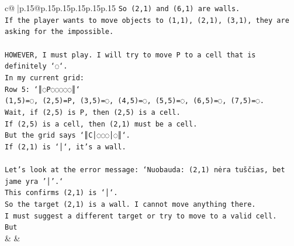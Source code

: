 \documentclass{article}
\begin{document}
{\begin{supertabular}{c@{$\;$}|p{.15\linewidth}@{}p{.15\linewidth}p{.15\linewidth}p{.15\linewidth}p{.15\linewidth}p{.15\linewidth}}
{{{\texttt{So (2,1) and (6,1) are walls.} \\
\texttt{If the player wants to move objects to (1,1), (2,1), (3,1), they are asking for the impossible.} \\
\\ 
\texttt{HOWEVER, I must play. I will try to move P to a cell that is definitely `◌`.} \\
\texttt{In my current grid:} \\
\texttt{Row 5: `║◌P◌◌◌◌◌║`} \\
\texttt{(1,5)=◌, (2,5)=P, (3,5)=◌, (4,5)=◌, (5,5)=◌, (6,5)=◌, (7,5)=◌.} \\
\texttt{Wait, if (2,5) is P, then (2,5) is a cell.} \\
\texttt{If (2,5) is a cell, then (2,1) must be a cell.} \\
\texttt{But the grid says `║C│◌◌◌│◌║`.} \\
\texttt{If (2,1) is `│`, it's a wall.} \\
\\ 
\texttt{Let's look at the error message: `Nuobauda: (2,1) nėra tuščias, bet jame yra '│'.`} \\
\texttt{This confirms (2,1) is `│`.} \\
\texttt{So the target (2,1) is a wall. I cannot move anything there.} \\
\texttt{I must suggest a different target or try to move to a valid cell.} \\
\texttt{But} \\
            }
        }
    }
    & & \\ \\


\end{supertabular}}
\end{document}
